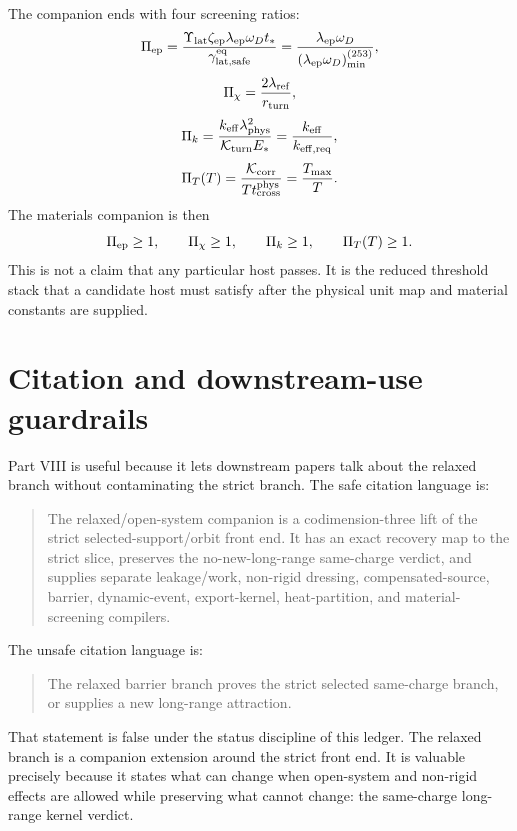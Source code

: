 The companion ends with four screening ratios:
\begin{equation}
\label{eq:part08-stage253-pi-ep}
\Pi_{\rm ep}
=
\frac{\Upsilon_{\rm lat}\zeta_{\rm ep}\lambda_{\rm ep}\omega_Dt_*}{\gamma_{\rm lat,safe}^{\rm eq}}
=
\frac{\lambda_{\rm ep}\omega_D}{(\lambda_{\rm ep}\omega_D)_{\min}^{(253)}},
\end{equation}
\begin{equation}
\label{eq:part08-stage253-pi-chi}
\Pi_\chi=\frac{2\lambda_{\rm ref}}{r_{\rm turn}},
\end{equation}
\begin{equation}
\label{eq:part08-stage253-pi-k}
\Pi_k=
\frac{k_{\rm eff}\lambda_{\rm phys}^{2}}{\mathcal K_{\rm turn}E_*}
=
\frac{k_{\rm eff}}{k_{\rm eff,req}},
\end{equation}
\begin{equation}
\label{eq:part08-stage253-pi-t}
\Pi_T(T)=
\frac{\mathcal K_{\rm corr}}{Tt_{\rm cross}^{\rm phys}}
=
\frac{T_{\max}}{T}.
\end{equation}
The materials companion is then
\begin{equation}
\label{eq:part08-stage253-final-screen}
\Pi_{\rm ep}\ge1,
\qquad
\Pi_\chi\ge1,
\qquad
\Pi_k\ge1,
\qquad
\Pi_T(T)\ge1.
\end{equation}
This is not a claim that any particular host passes.  It is the reduced threshold stack that a candidate host must satisfy after the physical unit map and material constants are supplied.

\section{Citation and downstream-use guardrails}
\label{sec:part08-downstream-guardrails}

Part VIII is useful because it lets downstream papers talk about the relaxed branch without contaminating the strict branch.  The safe citation language is:
\begin{quote}
The relaxed/open-system companion is a codimension-three lift of the strict selected-support/orbit front end.  It has an exact recovery map to the strict slice, preserves the no-new-long-range same-charge verdict, and supplies separate leakage/work, non-rigid dressing, compensated-source, barrier, dynamic-event, export-kernel, heat-partition, and material-screening compilers.
\end{quote}

The unsafe citation language is:
\begin{quote}
The relaxed barrier branch proves the strict selected same-charge branch, or supplies a new long-range attraction.
\end{quote}
That statement is false under the status discipline of this ledger.  The relaxed branch is a companion extension around the strict front end.  It is valuable precisely because it states what can change when open-system and non-rigid effects are allowed while preserving what cannot change: the same-charge long-range kernel verdict.

